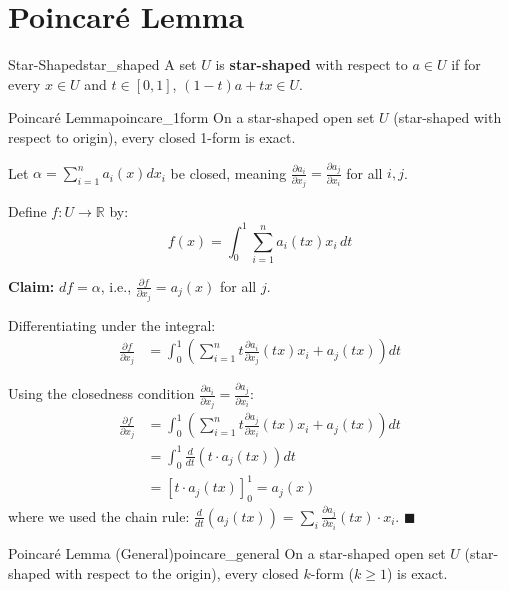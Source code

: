 \documentclass[11pt, letterpaper, openany]{book}
\renewenvironment{proof}[1][\proofname]{%
  \tcolorbox[blanker, breakable, left=1em,
    before skip=1em, after skip=1em,
    borderline west={2pt}{0pt}{MagicTeal!50},
    colback=MagicCream,
    before upper={\textcolor{MagicTeal}{\sffamily\bfseries #1.}\space}
  ]%
}{%
  \hfill\textcolor{MagicTeal}{\ensuremath{\blacksquare}}\endtcolorbox%
}
\begin{document}
\section{Poincaré Lemma}

\begin{defn}{Star-Shaped}{star_shaped}
A set $U$ is \textbf{star-shaped} with respect to $a \in U$ if for every $x \in U$ and $t \in [0,1]$, $(1-t)a + tx \in U$.
\end{defn}

\begin{thm}{Poincaré Lemma}{poincare_1form}
On a star-shaped open set $U$ (star-shaped with respect to origin), every closed 1-form is exact.
\end{thm}

\begin{proof}
Let $\alpha = \sum_{i=1}^n a_i(x) dx_i$ be closed, meaning $\frac{\partial a_i}{\partial x_j} = \frac{\partial a_j}{\partial x_i}$ for all $i, j$.

Define $f: U \to \mathbb{R}$ by:
\[f(x) = \int_0^1 \sum_{i=1}^n a_i(tx) x_i \, dt\]

\textbf{Claim:} $df = \alpha$, i.e., $\frac{\partial f}{\partial x_j} = a_j(x)$ for all $j$.

Differentiating under the integral:
\begin{align*}
\frac{\partial f}{\partial x_j} &= \int_0^1 \left( \sum_{i=1}^n t \frac{\partial a_i}{\partial x_j}(tx) x_i + a_j(tx) \right) dt
\end{align*}

Using the closedness condition $\frac{\partial a_i}{\partial x_j} = \frac{\partial a_j}{\partial x_i}$:
\begin{align*}
\frac{\partial f}{\partial x_j} &= \int_0^1 \left( \sum_{i=1}^n t \frac{\partial a_j}{\partial x_i}(tx) x_i + a_j(tx) \right) dt \\
&= \int_0^1 \frac{d}{dt}\left( t \cdot a_j(tx) \right) dt \\
&= [t \cdot a_j(tx)]_0^1 = a_j(x)
\end{align*}
where we used the chain rule: $\frac{d}{dt}(a_j(tx)) = \sum_i \frac{\partial a_j}{\partial x_i}(tx) \cdot x_i$.
\end{proof}

\begin{thm}{Poincaré Lemma (General)}{poincare_general}
On a star-shaped open set $U$ (star-shaped with respect to the origin), every closed $k$-form ($k \geq 1$) is exact.
\end{thm}
\end{document}
